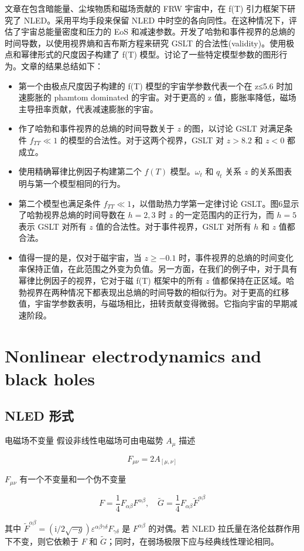 \documentclass[9pt, dvipsnames]{beamer} %
\begin{document}
\begin{frame}
    文章在包含暗能量、尘埃物质和磁场贡献的 FRW 宇宙中，在 f(T) 引力框架下研究了 NLED。采用平均手段来保留 NLED 中时空的各向同性。在这种情况下，评估了宇宙总能量密度和压力的 EoS 和减速参数。开发了哈勃和事件视界的总熵的时间导数，以使用视界熵和吉布斯方程来研究 GSLT 的合法性(validity)。使用极点和幂律形式的尺度因子构建了 f(T) 模型。讨论了一些特定模型参数的图形行为。文章的结果总结如下：


    \begin{itemize}
        \item 第一个由极点尺度因子构建的 f(T) 模型的宇宙学参数代表一个在 z≤5.6 时加速膨胀的 phamtom dominated 的宇宙。对于更高的 z 值，膨胀率降低，磁场主导扭率贡献，代表减速膨胀的宇宙。
        \item 作了哈勃和事件视界的总熵的时间导数关于 $z$ 的图，以讨论 GSLT 对满足条件 $f_{TT} \ll 1 $  的模型的合法性。对于这两个视界，GSLT 对 $z >8.2$ 和 $z <0$ 都成立。
        \item 使用精确幂律比例因子构建第二个 $f(T)$ 模型。$\omega_t$ 和 $q_t$ 关系 $z$ 的关系图表明与第一个模型相同的行为。
        \item 第二个模型也满足条件 $f_{TT}\ll 1$，以借助热力学第一定律讨论 GSLT。图6显示了哈勃视界总熵的时间导数在 $h = 2,3$ 时 $z$ 的一定范围内的正行为，而 $h = 5$ 表示 GSLT 对所有 $z$ 值的合法性。对于事件视界，GSLT 对所有 $h$ 和 $z$ 值都合法。
        \item 值得一提的是，仅对于磁宇宙，当 $z \geqslant -0.1$ 时，事件视界的总熵的时间变化率保持正值，在此范围之外变为负值。另一方面，在我们的例子中，对于具有幂律比例因子的视界，它对于磁 f(T) 框架中的所有 $z$ 值都保持在正区域。哈勃视界在两种情况下都表现出总熵的时间导数的相似行为。对于更高的红移值，宇宙学参数表明，与磁场相比，扭转贡献变得微弱。它指向宇宙的早期减速阶段。
    \end{itemize}
\end{frame}

\section{Nonlinear electrodynamics and black holes}

\subsection{NLED 形式}

\begin{frame}{电磁场不变量}
    假设非线性电磁场可由电磁势 $A_\mu$ 描述

    $$
    F_{\mu\nu}
    =2A_{[\mu,\nu]}
    $$

    $F_{\mu\nu}$ 有一个不变量和一个伪不变量

    $$
    F = \frac{1 }{4 } F_{\alpha\beta}F^{\alpha\beta},\quad
    \tilde{G} = \frac{1 }{4 } F_{\alpha\beta} \tilde{F}^{\alpha\beta} 
    $$

    其中 $\tilde{F}^{\alpha\beta}=\left(\mathrm{i}/2\sqrt{-g} \right)\varepsilon^{\alpha\beta\gamma\delta}F_{\gamma\delta}$ 是 $F^{\alpha\beta}$ 的对偶。若 NLED 拉氏量在洛伦兹群作用下不变，则它依赖于 $F$ 和 $\tilde{G}$；同时，在弱场极限下应与经典线性理论相同。
\end{frame}
\end{document}
